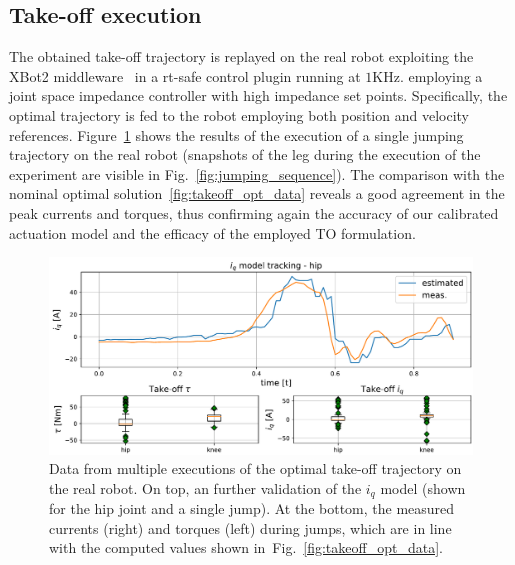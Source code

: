 \subsection{Take-off execution}
The obtained take-off trajectory is replayed on the real robot exploiting the XBot2 middleware~\cite{xbot::LAURENZI2023104379} in a rt-safe control plugin running at $1\mathrm{KHz}$. employing a joint space impedance controller with high impedance set points. Specifically, the optimal trajectory is fed to the robot employing both position and velocity references. Figure~\ref{fig:takeoff_execution} shows the results of the execution of a single jumping trajectory on the real robot (snapshots of the leg during the execution of the experiment are visible in Fig.~\ref{fig:jumping_sequence}). The comparison with the nominal optimal solution~\ref{fig:takeoff_opt_data} reveals a good agreement in the peak currents and torques, thus confirming again the accuracy of our calibrated actuation model and the efficacy of the employed TO formulation.
\begin{figure}[h]
	\centering
	\includegraphics[width=1\columnwidth]{images/hardware_saturation.pdf}
	\caption{Data from multiple executions of the optimal take-off trajectory on the real robot. On top, an further validation of the $i_q$ model (shown for the hip joint and a single jump). At the bottom, the measured currents (right) and torques (left) during  jumps, which are in line with the computed values shown in~Fig.~\ref{fig:takeoff_opt_data}.}
	\label{fig:takeoff_execution}
\end{figure}
